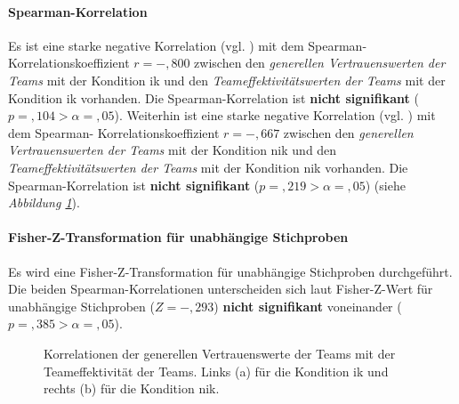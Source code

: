 \documentclass[a4paper,11pt]{article}%
\renewcommand{\\}{\vspace*{0.5\baselineskip} \newline}
\begin{document}
{\paragraph{Spearman-Korrelation}
Es ist eine starke negative Korrelation (vgl. \citep{cohen2013statistical}) mit dem Spearman-Korrelationskoeffizient $r = -,800$ zwischen den \textit{generellen Vertrauenswerten der Teams} mit der Kondition \ac{ik} und den \textit{Teameffektivitätswerten der Teams} mit der Kondition \newline \ac{ik} vorhanden. Die Spearman-Korrelation ist \textbf{nicht signifikant} ($p =,104 > \alpha = ,05$).\\
Weiterhin ist eine starke negative Korrelation (vgl. \citep{cohen2013statistical}) mit dem Spearman- Korrelationskoeffizient $r = -,667$ zwischen den \textit{generellen Vertrauenswerten der Teams} mit der Kondition \ac{nik} und den \textit{Teameffektivitätswerten der Teams} mit der Kondition \newline \ac{nik} vorhanden. Die Spearman-Korrelation ist \textbf{nicht signifikant} ($p =,219 > \alpha = ,05$) (siehe \textit{Abbildung \ref{H5_Korrelation_Auswertung}}). 

\paragraph{Fisher-Z-Transformation für unabhängige Stichproben}
Es wird eine Fisher-Z-Transformation für unabhängige Stichproben durchgeführt.
Die beiden Spearman-Korrelationen unterscheiden sich laut Fisher-Z-Wert für unabhängige Stichproben ($Z=-,293$) \textbf{nicht signifikant} voneinander ($p =,385 > \alpha = ,05$).

\begin{figure}[h]
  \centering
  \qquad
  \caption[Korrelationen der generellen Vertrauenswerte der Teams mit der Teameffektivität der Teams]{Korrelationen der generellen Vertrauenswerte der Teams mit der Teameffektivität der Teams. Links (a) für die Kondition \ac{ik} und rechts (b) für die Kondition \ac{nik}.}
  \label{H5_Korrelation_Auswertung}
\end{figure}

}
\end{document}
